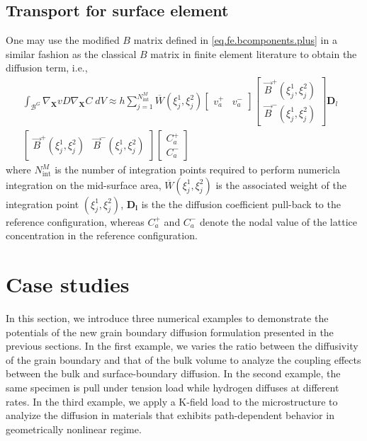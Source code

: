 \documentclass[10pt]{elsarticle}
\newcommand{\mbs}[1]{\boldsymbol{#1}}
\def\bs{{\mbs{s}}} \def\bt{{\mbs{t}}} \def\bu{{\mbs{u}}}
\def\bs{\boldsymbol}
\newcommand{\tensor}[1]{\ensuremath{\boldsymbol{#1}}}
\begin{document}
\subsection{Transport for surface element}
One may use the modified $B$ matrix defined in
\eqref{eq.fe.bcomponents.plus} in a similar fashion as the classical 
$B$ matrix in finite element literature to obtain the diffusion term, i.e., 
\begin{align}
\label{eq:DiscreteDiffusion} 
 \int_{\mathcal{B}^{G}} \nabla_{\bs{X}} v D \nabla_{\bs{X}} C \; dV
  \approx   
h \sum_{j=1}^{N^{M}_{\text{int}}}  \overline{W}(\xi_{j}^{1}, \xi_{j}^{2})
\begin{bmatrix} v_{a}^{+} &  v_{a}^{-} \end{bmatrix} 
\begin{bmatrix} \vec{B}^{+}(\xi_{j}^{1}, \xi_{j}^{2}) \\ \vec{B}^{-}(\xi_{j}^{1}, \xi_{j}^{2}) \end{bmatrix}
\tensor{D}_{l} \nonumber \\
\begin{bmatrix} \vec{B}^{+}(\xi_{j}^{1}, \xi_{j}^{2}) & \vec{B}^{-}(\xi_{j}^{1}, \xi_{j}^{2}) \end{bmatrix} 
\begin{bmatrix} C_{a}^{+} \\ C_{a}^{-} \end{bmatrix} &
\end{align}
where $N^{M}_{\text{int}}$ is the number of integration points required to 
perform numericla integration on the mid-surface area, 
$\overline{W}(\xi^{1}_{j}, \xi_{j}^{2})$ is the associated weight
of the integration point $(\xi^{1}_{j}, \xi_{j}^{2})$, $\tensor{D_{l}}$ is the 
the diffusion coefficient pull-back to the reference configuration, whereas 
$C_{a}^{+}$ and $C_{a}^{-}$ denote the nodal value of the lattice
concentration in the reference configuration.  
 
\section{Case studies}
In this section, we introduce three numerical examples to demonstrate the potentials of the 
new grain boundary diffusion formulation presented in the previous sections.
In the first example, we varies the ratio between the diffusivity of the grain boundary 
and that of the bulk volume to analyze the coupling effects between the bulk
and surface-boundary diffusion. In the second example, the same specimen is pull 
under tension load while hydrogen diffuses at different rates. In the third example,
we apply a K-field load to the microstructure to analyize the diffusion in materials that 
exhibits path-dependent behavior in geometrically nonlinear regime.  
\end{document}
